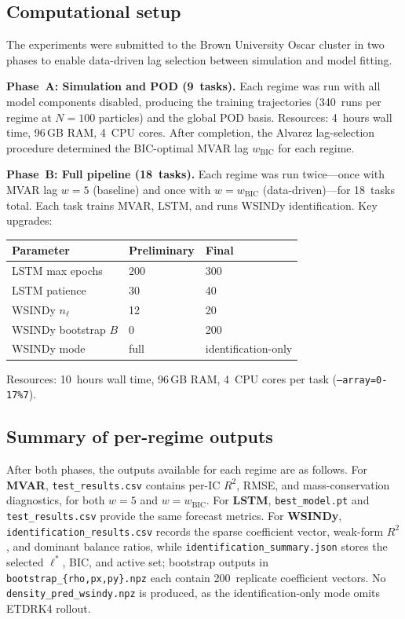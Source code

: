 \subsection{Computational setup}
\label{sec:two_phase_oscar}

The experiments were submitted to the Brown University Oscar
cluster in two phases to enable data-driven lag selection between simulation
and model fitting.

\noindent\textbf{Phase~A: Simulation and POD (9~tasks).}
Each regime was run with all model components disabled, producing the
training trajectories (340~runs per regime at $N=100$ particles) and the
global POD basis.  Resources: 4~hours wall time, 96\,GB RAM, 4~CPU cores.
After completion, the Alvarez lag-selection procedure determined the
BIC-optimal MVAR lag $w_{\text{BIC}}$ for each regime.

\noindent\textbf{Phase~B: Full pipeline (18~tasks).}
Each regime was run twice---once with MVAR lag $w=5$ (baseline) and once
with $w = w_{\text{BIC}}$ (data-driven)---for 18~tasks total.  Each task
trains MVAR, LSTM, and runs WSINDy identification.  Key upgrades:

\begin{center}\small
\begin{tabular}{lll}
\toprule
\textbf{Parameter} & \textbf{Preliminary} & \textbf{Final} \\
\midrule
LSTM max epochs       & 200  & 300  \\
LSTM patience         & 30   & 40   \\
WSINDy $n_{\ell}$     & 12   & 20   \\
WSINDy bootstrap $B$  & 0    & 200  \\
WSINDy mode           & full & identification-only \\
\bottomrule
\end{tabular}
\end{center}

Resources: 10~hours wall time, 96\,GB RAM, 4~CPU cores per task
(\texttt{--array=0-17\%7}).

\subsection{Summary of per-regime outputs}

After both phases, the outputs available for each regime are as follows.
For \textbf{MVAR}, \texttt{test\_results.csv} contains per-IC $R^2$, RMSE, and
mass-conservation diagnostics, for both $w=5$ and $w=w_{\text{BIC}}$.
For \textbf{LSTM}, \texttt{best\_model.pt} and \texttt{test\_results.csv}
provide the same forecast metrics.
For \textbf{WSINDy}, \texttt{identification\_results.csv} records the sparse
coefficient vector, weak-form $R^2$, and dominant balance ratios, while
\texttt{identification\_summary.json} stores the selected $\boldsymbol{\ell}^*$,
BIC, and active set; bootstrap outputs in
\texttt{bootstrap\_\{rho,px,py\}.npz} each contain 200~replicate
coefficient vectors.
No \texttt{density\_pred\_wsindy.npz} is produced, as the
identification-only mode omits ETDRK4 rollout.

